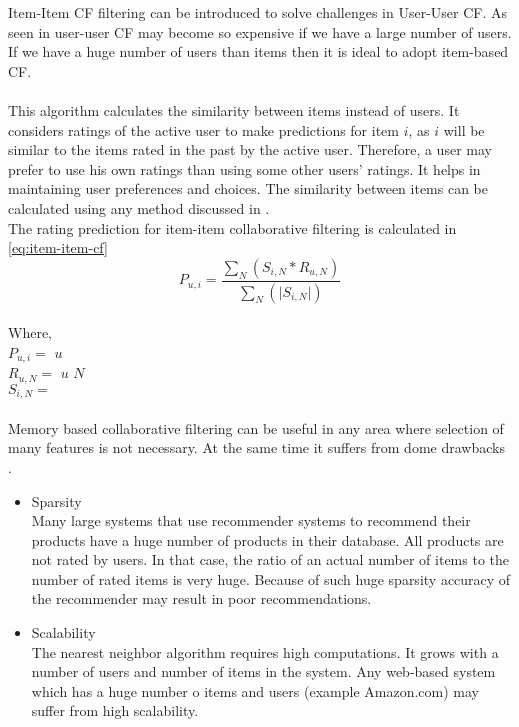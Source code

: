Item-Item CF filtering can be introduced to solve challenges in User-User CF. As seen in user-user CF may become so expensive if we have a large number of users. If we have a huge number of users than items then it is ideal to adopt item-based CF.
\\
\\
This algorithm calculates the similarity between items instead of users. It considers ratings of the active user to make predictions for item $i$, as $i$ will be similar to the items rated in the past by the active user. Therefore, a user may prefer to use his own ratings than using some other users' ratings. It helps in maintaining user preferences and choices. The similarity between items can be calculated using any method discussed in .
\\
The rating prediction for item-item collaborative filtering is calculated in \autoref{eq:item-item-cf}
\begin{equation}
P_{u,i} = \frac { \sum_N(S_{i,N} * R_{u,N})}{\sum_N (\vert S_{i,N} \vert)}
\label{eq:item-item-cf}
\end{equation}
\\
Where, 
\\
\noindent
$P_{u,i} = $  $u$ 
\\
$R_{u,N} = $  $u$  $N$ 
\\
$S_{i,N} = $ 
\\
\\
Memory based collaborative filtering can be useful in any area where selection of many features is not necessary. At the same time it suffers from dome drawbacks \cite{10}.
\\
\begin{itemize}
\item Sparsity \\
Many large systems that use recommender systems to recommend their products have a huge number of products in their database. All products are not rated by users. In that case, the ratio of an actual number of items to the number of rated items is very huge. Because of such huge sparsity accuracy of the recommender may result in poor recommendations.
\item Scalability \\
The nearest neighbor algorithm requires high computations. It grows with a number of users and number of items in the system. Any web-based system which has a huge number o items and users (example Amazon.com) may suffer from high scalability.

\end{itemize}

